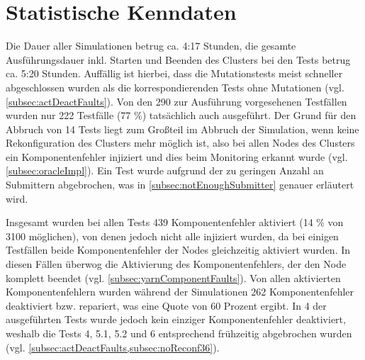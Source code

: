 \section{Statistische Kenndaten}
\label{sec:evaluationStats}

Die Dauer aller Simulationen betrug ca. 4:17 Stunden, die gesamte Ausführungsdauer inkl. Starten und Beenden des Clusters bei den Tests betrug ca. 5:20 Stunden.
Auffällig ist hierbei, dass die Mutationstests meist schneller abgeschlossen wurden als die korrespondierenden Tests ohne Mutationen (vgl. \cref{subsec:actDeactFaults}).
Von den 290 zur Ausführung vorgesehenen Testfällen wurden nur 222 Testfälle (77 \%) tatsächlich auch ausgeführt.
Der Grund für den Abbruch von 14 Tests liegt zum Großteil im Abbruch der Simulation, wenn keine Rekonfiguration des Clusters mehr möglich ist, also bei allen Nodes des Clusters ein Komponentenfehler injiziert und dies beim Monitoring erkannt wurde (vgl. \cref{subsec:oracleImpl}).
Ein Test wurde aufgrund der zu geringen Anzahl an Submittern abgebrochen, was in \cref{subsec:notEnoughSubmitter} genauer erläutert wird.

Insgesamt wurden bei allen Tests 439 Komponentenfehler aktiviert (14 \% von 3100 möglichen), von denen jedoch nicht alle injiziert wurden, da bei einigen Testfällen beide Komponentenfehler der Nodes gleichzeitig aktiviert wurden.
In diesen Fällen überwog die Aktivierung des Komponentenfehlers, der den Node komplett beendet (vgl.  \cref{subsec:yarnComponentFaults}).
Von allen aktivierten Komponentenfehlern wurden während der Simulationen 262 Komponentenfehler deaktiviert bzw. repariert, was eine Quote von 60 Prozent ergibt.
In 4 der ausgeführten Tests wurde jedoch kein einziger Komponentenfehler deaktiviert, weshalb die Tests 4, 5.1, 5.2 und 6 entsprechend frühzeitig abgebrochen wurden (vgl. \cref{subsec:actDeactFaults,subsec:noReconf36}).

